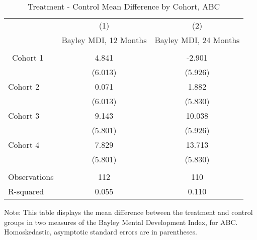 \begin{table}[H] 
\begin{threeparttable}
\caption{Treatment - Control Mean Difference by Cohort, ABC}
\label{table:abc}
\centering 
\begin{tabular}{lcc} \hline \hline
 & (1) & (2) \\
 & Bayley MDI, 12 Months & Bayley MDI, 24 Months \\ \hline
 &  &  \\\
Cohort 1 & 4.841 & -2.901 \\
 & (6.013) & (5.926) \\
Cohort 2 & 0.071 & 1.882 \\
 & (6.013) & (5.830) \\
Cohort 3 & 9.143 & 10.038 \\
 & (5.801) & (5.926) \\
Cohort 4 & 7.829 & 13.713 \\
 & (5.801) & (5.830) \\ \\ \hline
Observations & 112 & 110 \\
 R-squared & 0.055 & 0.110 \\ \hline \hline 
 \end{tabular}
\begin{tablenotes}
\footnotesize
\item Note: This table displays the mean difference between the treatment and control groups in two measures of the Bayley Mental Development Index, for ABC. Homoskedastic, asymptotic standard errors are in parentheses.
\end{tablenotes}
\end{threeparttable}
\end{table}
